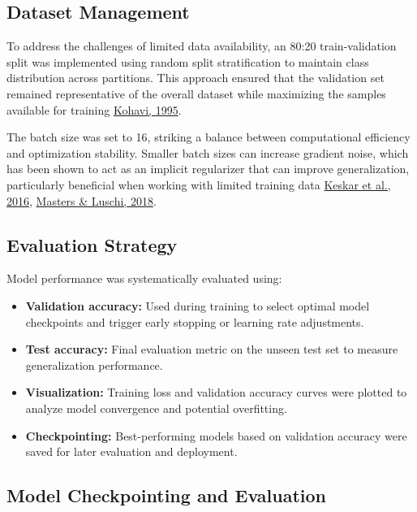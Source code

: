 \documentclass[a4paper,12pt]{article}
\begin{document}
\subsection{Dataset Management}

To address the challenges of limited data availability, an 80:20 train-validation split was implemented using random split stratification to maintain class distribution across partitions. This approach ensured that the validation set remained representative of the overall dataset while maximizing the samples available for training {\href{https://dl.acm.org/doi/10.5555/1643031.1643047}{Kohavi, 1995}}.

The batch size was set to 16, striking a balance between computational efficiency and optimization stability. Smaller batch sizes can increase gradient noise, which has been shown to act as an implicit regularizer that can improve generalization, particularly beneficial when working with limited training data {\href{https://arxiv.org/abs/1609.04836}{Keskar et al., 2016}, \href{https://arxiv.org/abs/1804.07612}{Masters \& Luschi, 2018}}.

\subsection{Evaluation Strategy}

Model performance was systematically evaluated using:

\begin{itemize}
    \item \textbf{Validation accuracy:} Used during training to select optimal model checkpoints and trigger early stopping or learning rate adjustments.
    \item \textbf{Test accuracy:} Final evaluation metric on the unseen test set to measure generalization performance.
    \item \textbf{Visualization:} Training loss and validation accuracy curves were plotted to analyze model convergence and potential overfitting.
    \item \textbf{Checkpointing:} Best-performing models based on validation accuracy were saved for later evaluation and deployment.
\end{itemize}

\subsection{Model Checkpointing and Evaluation}
\end{document}
